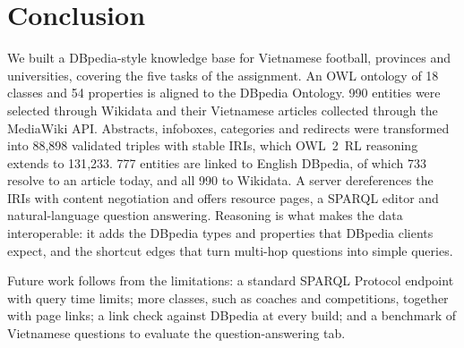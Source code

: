 \section{Conclusion}
\label{sec:conclusion}

We built a DBpedia-style knowledge base for Vietnamese football, provinces and
universities, covering the five tasks of the assignment. An OWL ontology of
18 classes and 54 properties is aligned to the DBpedia Ontology. 990 entities
were selected through Wikidata and their Vietnamese articles collected through
the MediaWiki API. Abstracts, infoboxes, categories and redirects were
transformed into 88{,}898 validated triples with stable IRIs, which OWL~2~RL
reasoning extends to 131{,}233. 777 entities are linked to English DBpedia, of
which 733 resolve to an article today, and all 990 to Wikidata. A server
dereferences the IRIs with content negotiation and offers resource pages, a
SPARQL editor and natural-language question answering. Reasoning is what
makes the data interoperable: it adds the DBpedia types and properties that
DBpedia clients expect, and the shortcut edges that turn multi-hop questions
into simple queries.

Future work follows from the limitations: a standard SPARQL Protocol endpoint
with query time limits; more classes, such as coaches and competitions,
together with page links; a link check against DBpedia at every build; and a
benchmark of Vietnamese questions to evaluate the question-answering tab.
